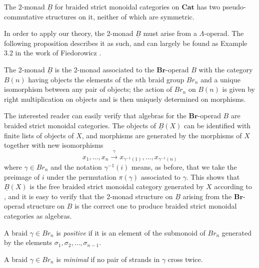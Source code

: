 \documentclass{amsbook} %
\newcommand{\mb}{\mathbf}
\numberwithin{section}{chapter}
\begin{document}
\begin{thm}\label{braidpscomm}
The 2-monad $\underline{B}$ for braided strict monoidal categories on $\mb{Cat}$ has two pseudo-commutative structures on it, neither of which are symmetric.
\end{thm}

In order to apply our theory, the 2-monad $\underline{B}$ must arise from a $\Lambda$-operad.  The following proposition describes it as such, and can largely be found as Example 3.2 in the work of Fiedorowicz \cite{fie-br}.

\begin{prop}
The 2-monad $\underline{B}$ is the 2-monad associated to the $\mb{Br}$-operad $B$ with the category $B(n)$ having objects the elements of the $n$th braid group $Br_{n}$ and a unique isomorphism between any pair of objects; the action of $Br_{n}$ on $B(n)$ is given by right multiplication on objects and is then uniquely determined on morphisms.
\end{prop}

The interested reader can easily verify that algebras for the $\mb{Br}$-operad $B$ are braided strict monoidal categories.  The objects of $\underline{B}(X)$ can be identified with finite lists of objects of $X$, and morphisms are generated by the morphisms of $X$ together with new isomorphisms
\[
x_{1}, \ldots, x_{n} \stackrel{\gamma}{\longrightarrow} x_{\gamma^{-1}(1)}, \ldots, x_{\gamma^{-1}(n)}
\]
where $\gamma \in Br_{n}$ and the notation $\gamma^{-1}(i)$ means, as before, that we take the preimage of $i$ under the permutation $\pi(\gamma)$ associated to $\gamma$.  This shows that $\underline{B}(X)$ is the free braided strict monoidal category generated by $X$ according to \cite{js}, and it is easy to verify that the 2-monad structure on $\underline{B}$ arising from the $\mb{Br}$-operad structure on $B$ is the correct one to produce braided strict monoidal categories as algebras.



\begin{Defi}
A braid $\gamma \in Br_{n}$ is \textit{positive} if it is an element of the submonoid of $Br_{n}$ generated by the elements $\sigma_{1}, \sigma_{2}, \ldots, \sigma_{n-1}$.
\end{Defi}

\begin{Defi}
 A braid $\gamma \in Br_{n}$ is \textit{minimal} if no pair of strands in $\gamma$ cross twice.
\end{Defi}
\end{document}
